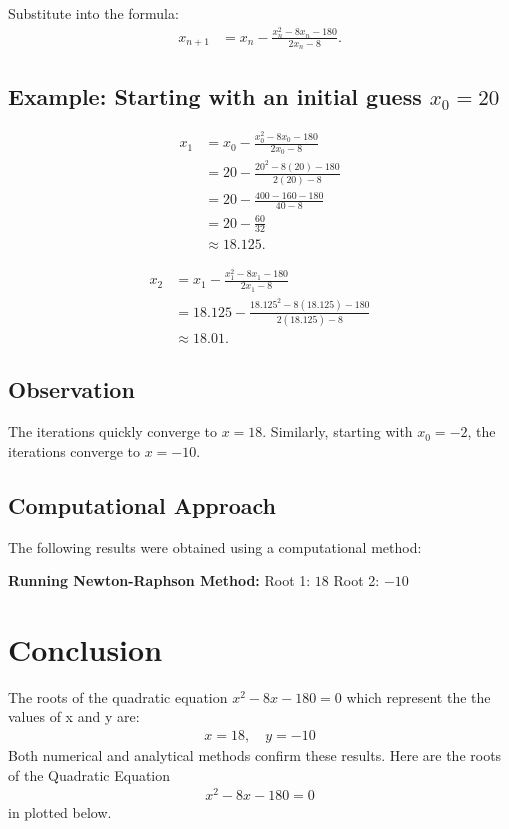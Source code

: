 \documentclass[journal]{IEEEtran}
\begin{document}
Substitute into the formula:
\begin{align}
x_{n+1} &= x_n - \frac{x_n^2 - 8x_n - 180}{2x_n - 8}. \tag{3.10}
\end{align}

\subsection*{Example: Starting with an initial guess \( x_0 = 20 \)}
\begin{align}
x_1 &= x_0 - \frac{x_0^2 - 8x_0 - 180}{2x_0 - 8} \nonumber \\
    &= 20 - \frac{20^2 - 8(20) - 180}{2(20) - 8} \nonumber \\
    &= 20 - \frac{400 - 160 - 180}{40 - 8} \nonumber \\
    &= 20 - \frac{60}{32} \nonumber \\
    &\approx 18.125. \tag{3.11}
\end{align}

\begin{align}
x_2 &= x_1 - \frac{x_1^2 - 8x_1 - 180}{2x_1 - 8} \nonumber \\
    &= 18.125 - \frac{18.125^2 - 8(18.125) - 180}{2(18.125) - 8} \nonumber \\
    &\approx 18.01. \tag{3.12}
\end{align}

\subsection*{Observation}
The iterations quickly converge to \( x = 18 \). Similarly, starting with \( x_0 = -2 \), the iterations converge to \( x = -10 \).

\subsection*{Computational Approach}
The following results were obtained using a computational method:

\textbf{Running Newton-Raphson Method:}  
Root 1: \( 18 \)  
Root 2: \( -10 \)


\section*{Conclusion}
The roots of the quadratic equation \( x^2 - 8x - 180 = 0 \) which represent the the values of x and y are:
\begin{align}
    x = 18, \quad y = -10
\end{align}
Both numerical and analytical methods confirm these results.
Here are the roots of the Quadratic Equation 
\begin{align}
    x^2 - 8x - 180 = 0
\end{align} in plotted below.\\
\end{document}
